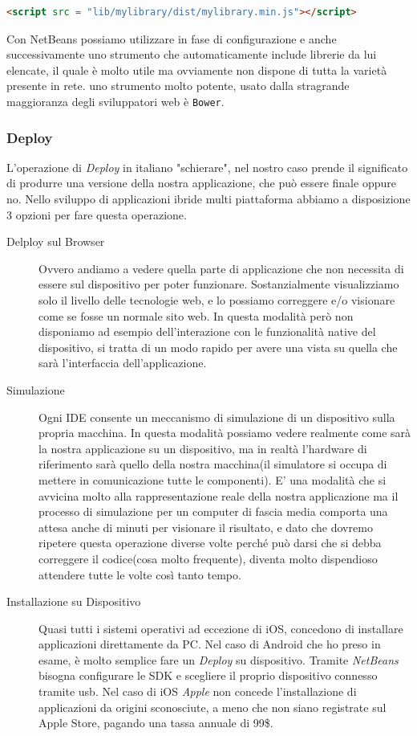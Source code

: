 \begin{lstlisting}[language=html]
	<script src = "lib/mylibrary/dist/mylibrary.min.js"></script>
\end{lstlisting}

Con NetBeans possiamo utilizzare in fase di configurazione e anche successivamente uno strumento che automaticamente include librerie da lui elencate, il quale è molto utile ma ovviamente non dispone di tutta la varietà presente in rete. uno strumento molto potente, usato dalla stragrande maggioranza degli sviluppatori web è \texttt{Bower}.

\subsubsection{Deploy}
L'operazione di \emph{Deploy} in italiano "schierare", nel nostro caso prende il significato di produrre una versione della nostra applicazione, che può essere finale oppure no. Nello sviluppo di applicazioni ibride multi piattaforma abbiamo a disposizione 3 opzioni per fare questa operazione.

\begin{description}
\item[Delploy sul Browser] Ovvero andiamo a vedere quella parte di applicazione che non necessita di essere sul dispositivo per poter funzionare. Sostanzialmente visualizziamo solo il livello delle tecnologie web, e lo possiamo correggere e/o visionare come se fosse un normale sito web. In questa modalità però non disponiamo ad esempio dell'interazione con le funzionalità native del dispositivo, si tratta di un modo rapido per avere una vista su quella che sarà l'interfaccia dell'applicazione.

\item[Simulazione] Ogni IDE consente un meccanismo di simulazione di un dispositivo sulla propria macchina. In questa modalità possiamo vedere realmente come sarà la nostra applicazione su un dispositivo, ma in realtà l'hardware di riferimento sarà quello della nostra macchina(il simulatore si occupa di mettere in comunicazione tutte le componenti). E' una modalità che si avvicina molto alla rappresentazione reale della nostra applicazione ma il processo di simulazione per un computer di fascia media comporta una attesa anche di minuti per visionare il risultato, e dato che dovremo ripetere questa operazione diverse volte perché può darsi che si debba correggere il codice(cosa molto frequente), diventa molto dispendioso attendere tutte le volte così tanto tempo.

\item[Installazione su Dispositivo] Quasi tutti i sistemi operativi ad eccezione di iOS, concedono di installare applicazioni direttamente da PC. Nel caso di Android che ho preso in esame, è molto semplice fare un \emph{Deploy} su dispositivo. Tramite \emph{NetBeans} bisogna configurare le SDK e scegliere il proprio dispositivo connesso tramite usb. Nel caso di iOS \emph{Apple} non concede l'installazione di applicazioni da origini sconosciute, a meno che non siano registrate sul Apple Store, pagando una tassa annuale di 99\$.

\end{description}

